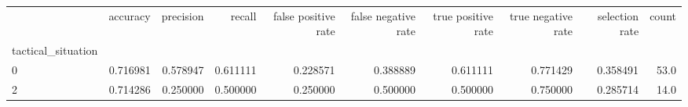 \begin{tabular}{lrrrrrrrrr}
\toprule
{} &  accuracy &  precision &    recall &  false positive rate &  false negative rate &  true positive rate &  true negative rate &  selection rate &  count \\
tactical\_situation &           &            &           &                      &                      &                     &                     &                 &        \\
\midrule
0                  &  0.716981 &   0.578947 &  0.611111 &             0.228571 &             0.388889 &            0.611111 &            0.771429 &        0.358491 &   53.0 \\
2                  &  0.714286 &   0.250000 &  0.500000 &             0.250000 &             0.500000 &            0.500000 &            0.750000 &        0.285714 &   14.0 \\
\bottomrule
\end{tabular}
